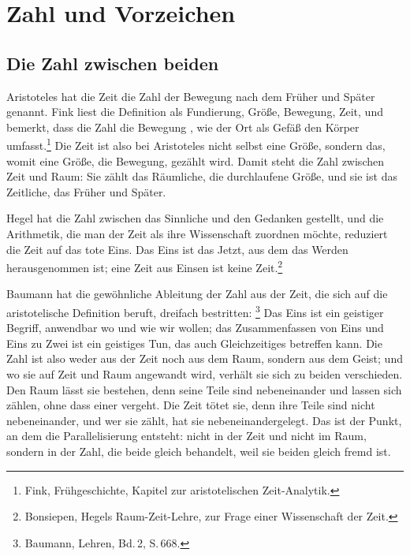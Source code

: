 \chapter{Zahl und Vorzeichen}

\section{Die Zahl zwischen beiden}

Aristoteles hat die Zeit die Zahl der Bewegung nach dem Früher und Später genannt. Fink liest die Definition als Fundierung, Größe, Bewegung, Zeit, und bemerkt, dass die Zahl die Bewegung , wie der Ort als Gefäß den Körper umfasst.\footnote{Fink, Frühgeschichte, Kapitel zur aristotelischen Zeit-Analytik.} Die Zeit ist also bei Aristoteles nicht selbst eine Größe, sondern das, womit eine Größe, die Bewegung, gezählt wird. Damit steht die Zahl zwischen Zeit und Raum: Sie zählt das Räumliche, die durchlaufene Größe, und sie ist das Zeitliche, das Früher und Später.

Hegel hat die Zahl zwischen das Sinnliche und den Gedanken gestellt, und die Arithmetik, die man der Zeit als ihre Wissenschaft zuordnen möchte, reduziert die Zeit auf das tote Eins. Das Eins ist das Jetzt, aus dem das Werden herausgenommen ist; eine Zeit aus Einsen ist keine Zeit.\footnote{Bonsiepen, Hegels Raum-Zeit-Lehre, zur Frage einer Wissenschaft der Zeit.}

Baumann hat die gewöhnliche Ableitung der Zahl aus der Zeit, die sich auf die aristotelische Definition beruft, dreifach bestritten: \footnote{Baumann, Lehren, Bd.\,2, S.\,668.} Das Eins ist ein geistiger Begriff, anwendbar wo und wie wir wollen; das Zusammenfassen von Eins und Eins zu Zwei ist ein geistiges Tun, das auch Gleichzeitiges betreffen kann. Die Zahl ist also weder aus der Zeit noch aus dem Raum, sondern aus dem Geist; und wo sie auf Zeit und Raum angewandt wird, verhält sie sich zu beiden verschieden. Den Raum lässt sie bestehen, denn seine Teile sind nebeneinander und lassen sich zählen, ohne dass einer vergeht. Die Zeit tötet sie, denn ihre Teile sind nicht nebeneinander, und wer sie zählt, hat sie nebeneinandergelegt. Das ist der Punkt, an dem die Parallelisierung entsteht: nicht in der Zeit und nicht im Raum, sondern in der Zahl, die beide gleich behandelt, weil sie beiden gleich fremd ist.

